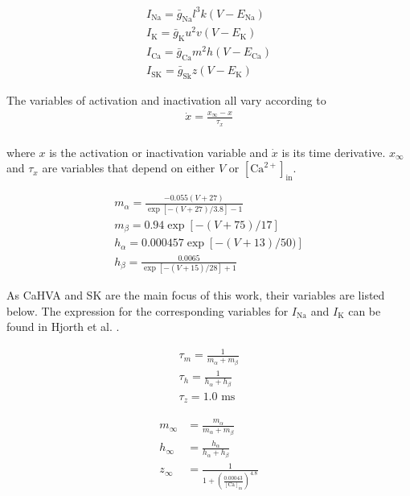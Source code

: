 \documentclass[times, twoside]{zHenriquesLab-StyleBioRxiv}
\begin{document}
\begin{align}
    I_\text{Na} = \bar{g}_\text{Na}l^3k(V-E_\text{Na})\\
    I_\text{K}  = \bar{g}_\text{K}u^2v(V-E_\text{K})\\
    I_\text{Ca} = \bar{g}_\text{Ca}m^2h(V-E_\text{Ca})\\
    I_\text{SK} = \bar{g}_\text{Sk}z(V-E_\text{K})
    \label{eq:Is}
\end{align}

The variables of activation and inactivation all vary according to
\begin{align}
    \dot{x} = \frac{x_\infty-x}{\tau_x}\\
    \label{eq:derivatives}
\end{align}

where $x$ is the activation or inactivation variable and $\dot{x}$ is its time derivative. $x_\infty$ and $\tau_x$ are variables that depend on either $V$ or $[\text{Ca}^{2+}]_\text{in}$.

\begin{align}
    m_\alpha =  \frac{-0.055(V+27)}{\exp{[-(V+27)/3.8]} - 1}\label{eq:malpha}\\
    m_\beta  =  0.94\exp{[-(V+75)/17]}\label{eq:mbeta}\\
    h_\alpha =  0.000457\exp{[-(V+13)/50)]}\\
    h_\beta  =  \frac{0.0065}{\exp{[-(V+15)/28]}+1}
\end{align}	

As CaHVA and SK are the main focus of this work, their variables are listed below. The expression for the corresponding variables for $I_\text{Na}$ and $I_\text{K}$ can be found in Hjorth et al. \cite{hjorth_microcircuits_2020}.

\begin{align}
    \tau_m = \frac{1}{m_\alpha + m_\beta}\\
    \tau_h = \frac{1}{h_\alpha + h_\beta}\\
    \tau_z = 1.0 \text{ ms}
\end{align}

\begin{align}
    m_\infty &= \frac{m_\alpha}{m_\alpha + m_\beta}\\
    h_\infty &= \frac{h_\alpha}{h_\alpha + h_\beta}\\
    z_\infty &= \frac{1}{1 + \left(\frac{0.00043}{\left[\text{Ca}\right]_\text{in}}\right)^{4.8}}
\end{align}
\end{document}
